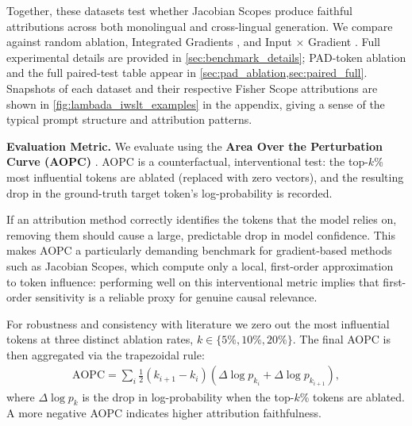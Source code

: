 \documentclass{article}
\begin{document}
Together, these datasets test whether Jacobian Scopes produce faithful attributions across both monolingual and cross-lingual generation.
We compare against random ablation, Integrated Gradients \cite{Sundararajan-Axiomatic-Attribution-DNN-2017}, and Input $\times$ Gradient \cite{shrikumar2017learning,simonyan2013deep}.
Full experimental details are provided in \cref{sec:benchmark_details}; PAD-token ablation and the full paired-test table appear in \cref{sec:pad_ablation,sec:paired_full}.
Snapshots of each dataset and their respective Fisher Scope attributions are shown in \cref{fig:lambada_iwslt_examples} in the appendix, giving a sense of the typical prompt structure and attribution patterns.

\noindent\textbf{Evaluation Metric.}
We evaluate using the \textbf{Area Over the Perturbation Curve (AOPC)} \cite{samek2016evaluating}.
AOPC is a counterfactual, interventional test: the top-$k$\% most influential tokens are ablated (replaced with zero vectors), and the resulting drop in the ground-truth target token's log-probability is recorded.

If an attribution method correctly identifies the tokens that the model relies on, removing them should cause a large, predictable drop in model confidence.
This makes AOPC a particularly demanding benchmark for gradient-based methods such as Jacobian Scopes, which compute only a local, first-order approximation to token influence: performing well on this interventional metric implies that first-order sensitivity is a reliable proxy for genuine causal relevance.

For robustness and consistency with literature \cite{samek2016evaluating, deyoung-etal-2020-eraser} we zero out the most influential tokens at three distinct ablation rates, $k \in \{5\%, 10\%, 20\%\}$. The final AOPC is then aggregated via the trapezoidal rule:
\begin{align}
    \mathrm{AOPC} = \sum_{i} \tfrac{1}{2}(k_{i+1} - k_i)
    \left(\Delta\log p_{k_i} + \Delta\log p_{k_{i+1}}\right),
\end{align}
where $\Delta \log p_k$ is the drop in log-probability when the top-$k$\% tokens are ablated.
A more negative AOPC indicates higher attribution faithfulness.
\end{document}

